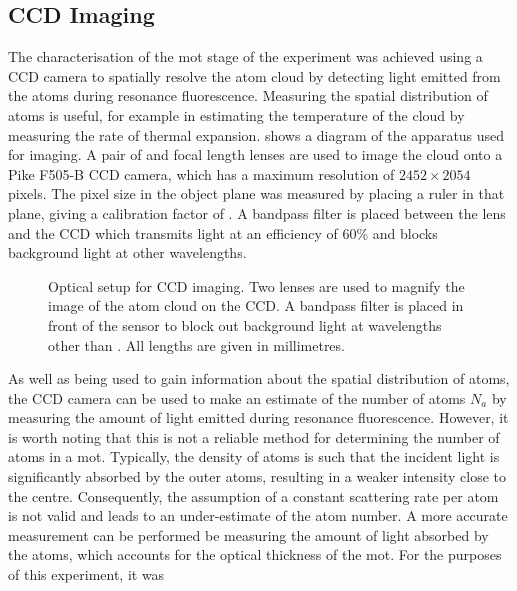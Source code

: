 \subsection{CCD Imaging}\label{sec:imaging}
The characterisation of the \ac{mot} stage of the experiment was achieved using
a CCD camera to spatially resolve the atom cloud by detecting light emitted from
the atoms during resonance fluorescence. Measuring the spatial distribution of
atoms is useful, for example in estimating the temperature of the cloud by
measuring the rate of thermal expansion.  shows a
diagram of the apparatus used for imaging. A pair of 
and  focal length lenses are used to image the cloud
onto a Pike F505-B CCD camera, which has a maximum resolution of \(2452 \times
2054\) pixels. The pixel size in the object plane was measured by placing a
ruler in that plane, giving a calibration factor of
. A bandpass filter is placed between the
lens and the CCD which transmits  light at an
efficiency of 60\% and blocks background light at other wavelengths.
\begin{figure}
	\centering
	\def\svgwidth{0.6\textwidth}
	
	\caption[Optical setup for CCD imaging]{Optical setup for CCD imaging. Two
		lenses are used to magnify the image of the atom cloud on the CCD. A
		bandpass filter is placed in front of the sensor to block out background
		light at wavelengths other than
		. All lengths are given in millimetres.}
	\label{fig:imaging_optics}
\end{figure}
\par\noindent As well as being used to gain information about the spatial
distribution of atoms, the CCD camera can be used to make an estimate of the
number of atoms \(N_a\) by measuring the amount of light emitted during
resonance fluorescence. However, it is worth noting that this is not a reliable
method for determining the number of atoms in a \ac{mot}. Typically, the density
of atoms is such that the incident light is significantly absorbed by the outer
atoms, resulting in a weaker intensity close to the centre. Consequently, the
assumption of a constant scattering rate per atom is not valid and leads to an
under-estimate of the atom number. A more accurate measurement can be performed
be measuring the amount of light absorbed by the atoms, which accounts for the
optical thickness of the \ac{mot}. For the purposes of this experiment, it was
